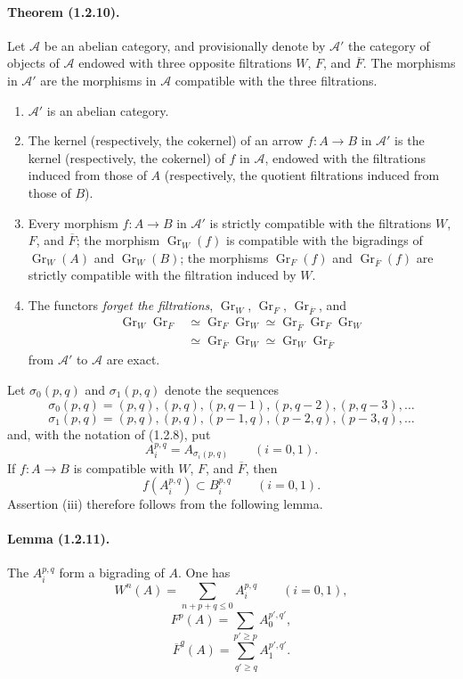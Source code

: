 \documentclass[10pt]{article}
\newcommand{\Gr}{\operatorname{Gr}}
\newcommand{\calA}{\mathcal A}
\begin{document}
\paragraph{Theorem (1.2.10).} Let $\calA$ be an abelian category, and provisionally denote by $\calA'$ the category of objects of $\calA$ endowed with three opposite filtrations $W$, $F$, and $\overline F$. The morphisms in $\calA'$ are the morphisms in $\calA$ compatible with the three filtrations.
\begin{enumerate}[label=(\roman*)]
\item $\calA'$ is an abelian category.
\item The kernel (respectively, the cokernel) of an arrow $f:A\to B$ in $\calA'$ is the kernel (respectively, the cokernel) of $f$ in $\calA$, endowed with the filtrations induced from those of $A$ (respectively, the quotient filtrations induced from those of $B$).
\item Every morphism $f:A\to B$ in $\calA'$ is strictly compatible with the filtrations $W$, $F$, and $\overline F$; the morphism $\Gr_W(f)$ is compatible with the bigradings of $\Gr_W(A)$ and $\Gr_W(B)$; the morphisms $\Gr_F(f)$ and $\Gr_{\overline F}(f)$ are strictly compatible with the filtration induced by $W$.
\item The functors \emph{forget the filtrations}, $\Gr_W$, $\Gr_F$, $\Gr_{\overline F}$, and
\[
\begin{aligned}
\Gr_W\Gr_F&\simeq\Gr_F\Gr_W\simeq\Gr_{\overline F}\Gr_F\Gr_W\\
&\simeq\Gr_{\overline F}\Gr_W\simeq\Gr_W\Gr_{\overline F}
\end{aligned}
\]
from $\calA'$ to $\calA$ are exact.
\end{enumerate}

Let $\sigma_0(p,q)$ and $\sigma_1(p,q)$ denote the sequences
\[
\sigma_0(p,q)=(p,q),(p,q),(p,q-1),(p,q-2),(p,q-3),\ldots
\]
\[
\sigma_1(p,q)=(p,q),(p,q),(p-1,q),(p-2,q),(p-3,q),\ldots
\]
and, with the notation of (1.2.8), put
\[
A_i^{p,q}=A_{\sigma_i(p,q)}\qquad(i=0,1).
\]
If $f:A\to B$ is compatible with $W$, $F$, and $\overline F$, then
\[
\tag{1.2.10.1}
f(A_i^{p,q})\subset B_i^{p,q}\qquad(i=0,1).
\]
Assertion (iii) therefore follows from the following lemma.

\paragraph{Lemma (1.2.11).} The $A_i^{p,q}$ form a bigrading of $A$. One has
\[
\tag{1.2.11.1}
W^n(A)=\sum_{n+p+q\le0} A_i^{p,q}\qquad(i=0,1),
\]
\[
\tag{1.2.11.2}
F^p(A)=\sum_{p'\ge p} A_0^{p',q'},
\]
\[
\tag{1.2.11.3}
\overline F^q(A)=\sum_{q'\ge q} A_1^{p',q'}.
\]
\end{document}
